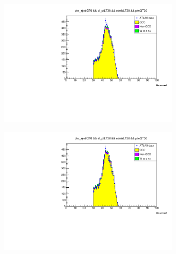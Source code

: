     \begin{figure}[H]
        \begin{subfigure}{0.5\textwidth}
            \includegraphics[width=\textwidth]{../W_mass/final_ptw_qcd0-33.pdf}
        \end{subfigure}
        \begin{subfigure}{0.5\textwidth}
            \includegraphics[width=\textwidth]{../W_mass/final_ptw_qcd0-35.pdf}
        \end{subfigure}
        \begin{subfigure}{0.5\textwidth}

\end{subfigure}
\end{figure}
